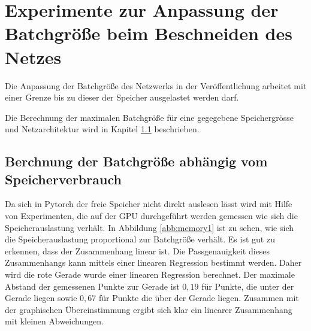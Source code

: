 \section{Experimente zur Anpassung der Batchgröße beim Beschneiden des Netzes}\label{sec:ptnew}

Die Anpassung der Batchgröße des Netzwerks in der Veröffentlichung arbeitet mit einer Grenze bis zu dieser der Speicher ausgelastet werden darf. 

Die Berechnung der maximalen Batchgröße für eine gegegebene Speichergrösse und Netzarchitektur wird in Kapitel \ref{sec:batch} beschrieben.

\subsection{Berchnung der Batchgröße abhängig vom Speicherverbrauch}\label{sec:batch}
Da sich in Pytorch der freie Speicher nicht direkt auslesen lässt wird mit Hilfe von Experimenten, die auf der GPU durchgeführt werden gemessen wie sich die Speicherauslastung verhält. In Abbildung \ref{abb:memory1} ist zu sehen, wie sich die Speicherauslastung proportional zur Batchgröße verhält. Es ist gut zu erkennen, dass der Zusammenhang linear ist. Die Passgenauigkeit dieses Zusammenhangs kann mittels einer linearen Regression bestimmt werden.  Daher wird  die rote Gerade wurde einer linearen Regression berechnet. Der maximale Abstand der gemessenen Punkte zur Gerade ist $0,19$ für Punkte, die unter der Gerade liegen sowie $0,67$ für Punkte die über der Gerade liegen. Zusammen mit der graphischen Übereinstimmung ergibt sich klar ein linearer Zusammenhang mit kleinen Abweichungen.
